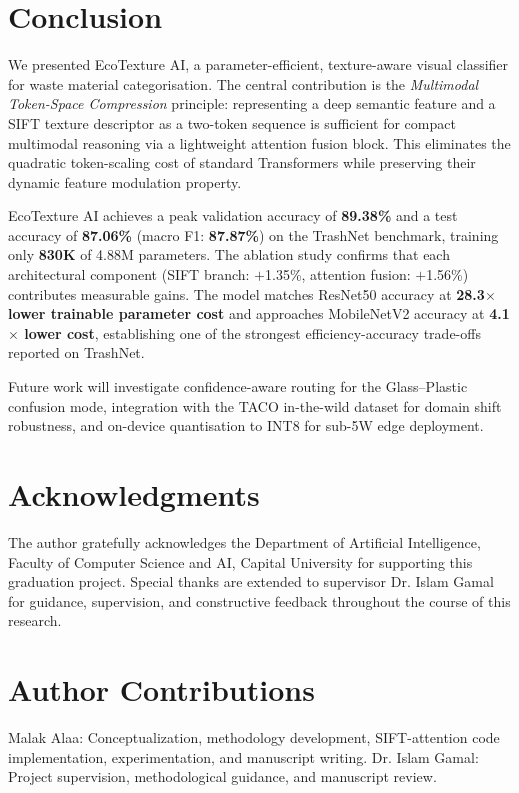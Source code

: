 \documentclass[12pt, a4paper]{article}
\begin{document}
\section{Conclusion}
\label{sec:conclusion}
We presented EcoTexture AI, a parameter-efficient, texture-aware visual classifier for waste material categorisation. The central contribution is the \emph{Multimodal Token-Space Compression} principle: representing a deep semantic feature and a SIFT texture descriptor as a two-token sequence is sufficient for compact multimodal reasoning via a lightweight attention fusion block. This eliminates the quadratic token-scaling cost of standard Transformers while preserving their dynamic feature modulation property.

EcoTexture AI achieves a peak validation accuracy of \textbf{89.38\%} and a test accuracy of \textbf{87.06\%} (macro F1: \textbf{87.87\%}) on the TrashNet benchmark, training only \textbf{830K} of 4.88M parameters. The ablation study confirms that each architectural component (SIFT branch: $+$1.35\%, attention fusion: $+$1.56\%) contributes measurable gains. The model matches ResNet50 accuracy at \textbf{28.3$\times$ lower trainable parameter cost} and approaches MobileNetV2 accuracy at \textbf{4.1$\times$ lower cost}, establishing one of the strongest efficiency-accuracy trade-offs reported on TrashNet.

Future work will investigate confidence-aware routing for the Glass--Plastic confusion mode, integration with the TACO in-the-wild dataset for domain shift robustness, and on-device quantisation to INT8 for sub-5W edge deployment.

\section*{Acknowledgments}
The author gratefully acknowledges the Department of Artificial Intelligence, Faculty of Computer Science and AI, Capital University for supporting this graduation project. Special thanks are extended to supervisor Dr. Islam Gamal for guidance, supervision, and constructive feedback throughout the course of this research.

\section*{Author Contributions}
Malak Alaa: Conceptualization, methodology development, SIFT-attention code implementation, experimentation, and manuscript writing. Dr. Islam Gamal: Project supervision, methodological guidance, and manuscript review.
\end{document}
